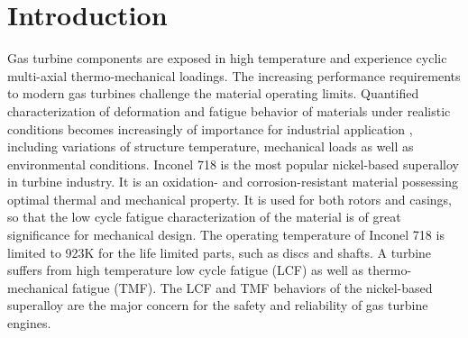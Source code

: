 \section{Introduction}
\noindent
Gas turbine components are exposed in high temperature and experience cyclic multi-axial thermo-mechanical loadings. The increasing performance requirements to modern gas turbines challenge  the material operating limits. Quantified characterization of deformation and fatigue behavior of materials under realistic conditions becomes increasingly of importance for industrial application \cite{harrison1996modelling}, including variations of structure temperature, mechanical loads as well as environmental conditions. Inconel 718 is the most popular nickel-based superalloy in turbine industry. It is an oxidation- and corrosion-resistant material possessing optimal thermal and mechanical property. It is used for both rotors and casings, so that the low cycle fatigue characterization of the material is of great significance for mechanical design. The operating temperature of Inconel 718 is limited to 923K for the life limited parts, such as discs and shafts.
A turbine suffers from high temperature low cycle fatigue (LCF) as well as thermo-mechanical fatigue (TMF).
The LCF and TMF behaviors of the nickel-based superalloy are the major concern for the safety and reliability of gas turbine engines.

